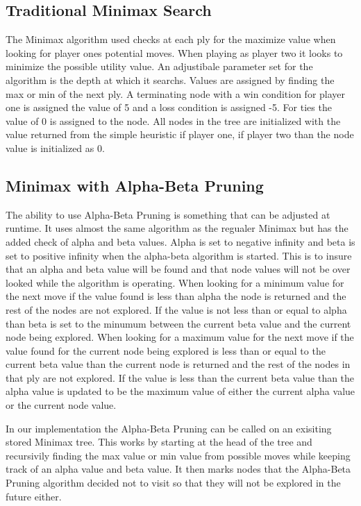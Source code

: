 \documentclass[12pt,letterpaper]{article}
\begin{document}
\subsection{Traditional Minimax Search}
The Minimax algorithm used checks at each ply for the maximize value when looking for player ones potential moves. When playing as player two it looks to minimize the possible utility value. An adjustibale parameter set for the algorithm is the depth at which it searchs. Values are assigned by finding the max or min of the next ply. A terminating node with a win condition for player one is assigned the value of 5 and a loss condition is assigned -5. For ties the value of 0 is assigned to the node. All nodes in the tree are initialized with the value returned from the simple heuristic if player one, if player two than the node value is initialized as 0. 

\subsection{Minimax with Alpha-Beta Pruning}
 The ability to use Alpha-Beta Pruning is something that can be adjusted at runtime. It uses almost the same algorithm as the regualer Minimax but has the added check of alpha and beta values. Alpha is set to negative infinity and beta is set to positive infinity when the alpha-beta algorithm is started. This is to insure that an alpha and beta value will be found and that node values will not be over looked while the algorithm is operating. When looking for a minimum value for the next move if the value found is less than alpha the node is returned and the rest of the nodes are not explored. If the value is not less than or equal to alpha than beta is set to the minumum between the current beta value and the current node being explored. When looking for a maximum value for the next move if the value found for the current node being explored is less than or equal to the current beta value than the current node is returned and the rest of the nodes in that ply are not explored. If the value is less than the current beta value than the alpha value is updated to be the maximum value of either the current alpha value or the current node value. 

In our implementation the Alpha-Beta Pruning can be called on an exisiting stored Minimax tree. This works by starting at the head of the tree and recursivily finding the max value or min value from possible moves while keeping track of an alpha value and beta value.  It then marks nodes that the Alpha-Beta Pruning algorithm decided not to visit so that they will not be explored in the future either. 
\end{document}
